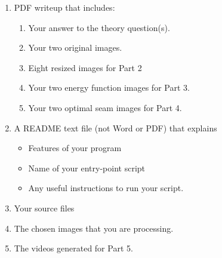 \documentclass[12pt]{article}
\begin{document}
\begin{enumerate}
\item PDF writeup that includes:
\begin{enumerate}
\item Your answer to the theory question(s).
\item Your two original images.
\item Eight resized images for Part 2
\item Your two energy function images for Part 3.
\item Your two optimal seam images for Part 4.
\end{enumerate}
\item A README text file (not Word or PDF) that explains
\begin{itemize}
\item Features of your program
\item Name of your entry-point script
\item Any useful instructions to run your script.
\end{itemize}
\item Your source files
\item The chosen images that you are processing.
\item The videos generated for Part 5.
\end{enumerate}
\end{document}
